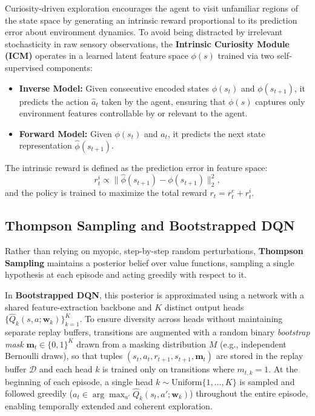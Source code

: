 \documentclass[10pt, a4paper]{report}
\begin{document}
Curiosity-driven exploration encourages the agent to visit unfamiliar regions of the state space by generating an intrinsic reward proportional to its prediction error about environment dynamics. To avoid being distracted by irrelevant stochasticity in raw sensory observations, the \textbf{Intrinsic Curiosity Module (ICM)} operates in a learned latent feature space $\phi(s)$ trained via two self-supervised components:
\begin{itemize}
    \item \textbf{Inverse Model:} Given consecutive encoded states $\phi(s_t)$ and $\phi(s_{t+1})$, it predicts the action $\hat{a}_t$ taken by the agent, ensuring that $\phi(s)$ captures only environment features controllable by or relevant to the agent.
    \item \textbf{Forward Model:} Given $\phi(s_t)$ and $a_t$, it predicts the next state representation $\hat{\phi}(s_{t+1})$.
\end{itemize}
The intrinsic reward is defined as the prediction error in feature space:
\[
    r_t^i \propto \big\| \hat{\phi}(s_{t+1}) - \phi(s_{t+1}) \big\|_2^2,
\]
and the policy is trained to maximize the total reward $r_t = r_t^e + r_t^i$.

\subsection{Thompson Sampling and Bootstrapped DQN}

Rather than relying on myopic, step-by-step random perturbations, \textbf{Thompson Sampling} maintains a posterior belief over value functions, sampling a single hypothesis at each episode and acting greedily with respect to it.

In \textbf{Bootstrapped DQN}, this posterior is approximated using a network with a shared feature-extraction backbone and $K$ distinct output heads $\{\hat{Q}_k(s, a; \mathbf{w}_k)\}_{k=1}^K$. To ensure diversity across heads without maintaining separate replay buffers, transitions are augmented with a random binary \emph{bootstrap mask} $\mathbf{m}_t \in \{0, 1\}^K$ drawn from a masking distribution $M$ (e.g., independent Bernoulli draws), so that tuples $(s_t, a_t, r_{t+1}, s_{t+1}, \mathbf{m}_t)$ are stored in the replay buffer $\mathcal{D}$ and each head $k$ is trained only on transitions where $m_{t,k} = 1$. At the beginning of each episode, a single head $k \sim \text{Uniform}\{1, \dots, K\}$ is sampled and followed greedily ($a_t \in \arg\max_{a'} \hat{Q}_k(s_t, a'; \mathbf{w}_k)$) throughout the entire episode, enabling temporally extended and coherent exploration.
\end{document}
